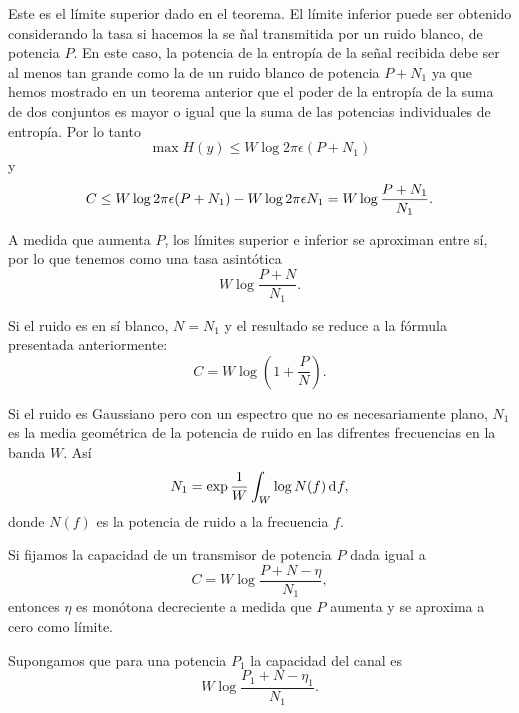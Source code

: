 Este es el l\'imite superior dado en el teorema. El l\'imite inferior
puede ser obtenido considerando la tasa si hacemos la se \~nal
transmitida por un ruido blanco, de potencia $P$. En este caso, la
potencia de la entrop\'ia de la se\~nal recibida debe ser al menos tan
grande como la de un ruido blanco de potencia $P + N_{1}$ ya que hemos
mostrado en un teorema anterior que el poder de la entrop\'ia de la
suma de dos conjuntos es mayor o igual que la suma de las potencias
individuales de entrop\'ia. Por lo tanto
\begin{equation}
\max H(y) \leq W\log 2\pi \epsilon(P+N_{1})
\end{equation}
y
\begin{equation}
C \leq W\log 2\pi \epsilon (P + N_{1}) - W\log 2 \pi \epsilon N_{1} \bigskip
= W\log \frac{P+N_{1}}{N_{1}}.
\end{equation}
	
A medida que aumenta $P$, los l\'imites superior e inferior se aproximan
entre s\'i, por lo que tenemos como una tasa asint\'otica
\begin{equation}
W\log \frac{P+N}{N_{1}}.
\end{equation}
	
Si el ruido es en s\'i blanco, $N = N_{1}$ y el resultado se reduce a
la f\'ormula presentada anteriormente:
\begin{equation}
C = W\log (1 + \frac{P}{N}).
\end{equation}
	
Si el ruido es Gaussiano pero con un espectro que no es necesariamente
plano, $N_{1}$ es la media geom\'etrica de la potencia de
ruido en las difrentes frecuencias en la banda $W$. As\'i
\begin{equation}
N_{1} = \exp \frac{1}{W} \int_W \log N(f) \diff f,
\end{equation}
donde $N(f)$ es la potencia de ruido a la frecuencia $f$.

\begin{theorem}
\label{t19}
Si fijamos la capacidad de un transmisor de potencia $P$ dada igual
a 
\begin{equation}
 C = W\log \frac{P+N - \eta}{N_{1}},
\end{equation}
entonces $\eta$ es mon\'otona decreciente a medida que $P$ aumenta y
se aproxima a cero como l\'imite.
\end{theorem}
	
Supongamos que para una potencia $P_{1}$ la capacidad del canal es
\begin{equation}
W\log \frac{P_{1} + N - \eta_{1}}{N_{1}}.
\end{equation}


